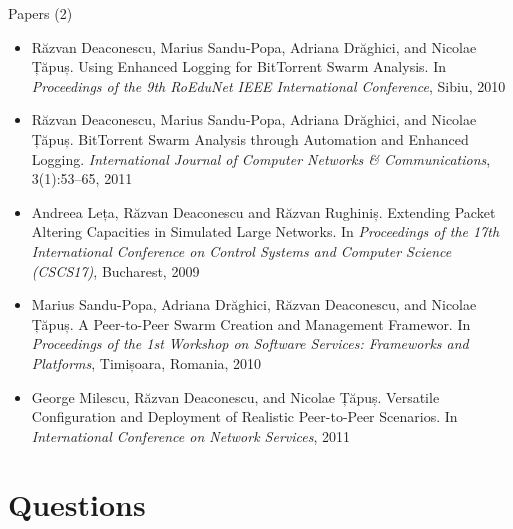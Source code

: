 \documentclass{beamer}
\begin{document}
\begin{frame}{Papers (2)}
  \begin{itemize}
    \scriptsize
    \item Răzvan Deaconescu, Marius Sandu-Popa, Adriana Drăghici, and Nicolae
    Țăpuș. Using Enhanced Logging for BitTorrent Swarm Analysis. In
    \textit{Proceedings of the 9th RoEduNet IEEE International Conference},
    Sibiu, 2010
    \item Răzvan Deaconescu, Marius Sandu-Popa, Adriana Drăghici, and Nicolae
    Țăpuș. BitTorrent Swarm Analysis through Automation and Enhanced Logging.
    \textit{International Journal of Computer Networks \& Communications},
    3(1):53--65, 2011
    \item Andreea Leța, Răzvan Deaconescu and Răzvan Rughiniș. Extending Packet
    Altering Capacities in Simulated Large Networks. In \textit{Proceedings of
    the 17th International Conference on Control Systems and Computer Science
    (CSCS17)}, Bucharest, 2009
    \item Marius Sandu-Popa, Adriana Drăghici, Răzvan Deaconescu, and Nicolae
    Țăpuș. A Peer-to-Peer Swarm Creation and Management Framewor. In
    \textit{Proceedings of the 1st Workshop on Software Services: Frameworks and
    Platforms}, Timișoara, Romania, 2010
    \item George Milescu, Răzvan Deaconescu, and Nicolae Țăpuș. Versatile
    Configuration and Deployment of Realistic Peer-to-Peer Scenarios. In
    \textit{International Conference on Network Services}, 2011
  \end{itemize}
\end{frame}

\section{Questions}
\end{document}
